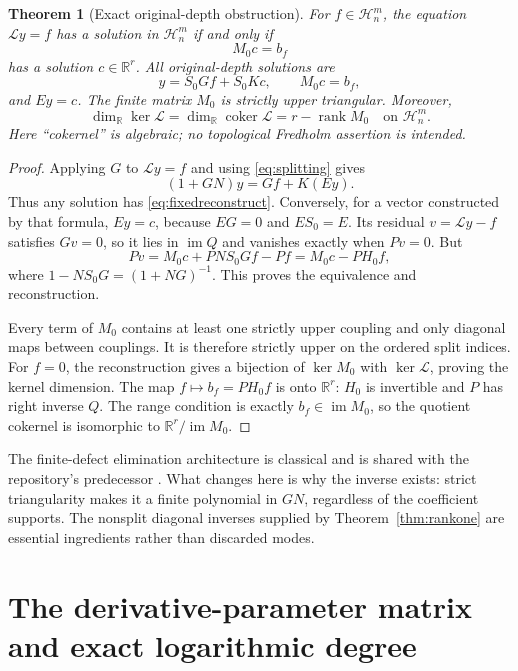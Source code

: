\documentclass[11pt,a4paper]{article}
\numberwithin{equation}{section}
\newtheorem{theorem}{Theorem}[section]
\theoremstyle{definition}
\theoremstyle{remark}\newtheorem{remark}[theorem]{Remark}
\newcommand{\R}{\mathbb R}\newcommand{\C}{\mathbb C}
\newcommand{\Hh}{\mathcal H}\newcommand{\Ll}{\mathcal L}
\newcommand{\rank}{\operatorname{rank}}\newcommand{\diag}{\operatorname{diag}}
\newcommand{\im}{\operatorname{im}}\newcommand{\coker}{\operatorname{coker}}
\begin{document}
\begin{theorem}[Exact original-depth obstruction]
\label{thm:fixed}
For $f\in\Hh_n^m$, the equation $\Ll y=f$ has a solution in $\Hh_n^m$ if and only if
\begin{equation}
 M_0c=b_f
 \label{eq:fixedmatrix}
\end{equation}
has a solution $c\in\R^r$. All original-depth solutions are
\begin{equation}
 y=S_0Gf+S_0Kc,\qquad M_0c=b_f,
 \label{eq:fixedreconstruct}
\end{equation}
and $Ey=c$. The finite matrix $M_0$ is strictly upper triangular. Moreover,
\begin{equation}
 \dim_\R\ker\Ll=\dim_\R\coker\Ll=r-\rank M_0
 \quad\text{on }\Hh_n^m.
 \label{eq:fredholm}
\end{equation}
Here ``cokernel'' is algebraic; no topological Fredholm assertion is intended.
\end{theorem}
\begin{proof}
Applying $G$ to $\Ll y=f$ and using \eqref{eq:splitting} gives
\[
 (1+GN)y=Gf+K(Ey).
\]
Thus any solution has \eqref{eq:fixedreconstruct}. Conversely, for a vector constructed by that formula, $Ey=c$, because $EG=0$ and $ES_0=E$. Its residual $v=\Ll y-f$ satisfies $Gv=0$, so it lies in $\im Q$ and vanishes exactly when $Pv=0$. But
\[
 Pv=M_0c+PNS_0Gf-Pf=M_0c-PH_0f,
\]
where $1-NS_0G=(1+NG)^{-1}$. This proves the equivalence and reconstruction.

Every term of $M_0$ contains at least one strictly upper coupling and only diagonal maps between couplings. It is therefore strictly upper on the ordered split indices. For $f=0$, the reconstruction gives a bijection of $\ker M_0$ with $\ker\Ll$, proving the kernel dimension. The map $f\mapsto b_f=PH_0f$ is onto $\R^r$: $H_0$ is invertible and $P$ has right inverse $Q$. The range condition is exactly $b_f\in\im M_0$, so the quotient cokernel is isomorphic to $\R^r/\im M_0$.
\end{proof}

The finite-defect elimination architecture is classical and is shared with the repository's predecessor \cite{repo-residue,repo-smith}. What changes here is why the inverse exists: strict triangularity makes it a finite polynomial in $GN$, regardless of the coefficient supports. The nonsplit diagonal inverses supplied by Theorem~\ref{thm:rankone} are essential ingredients rather than discarded modes.

\section{The derivative-parameter matrix and exact logarithmic degree}
\label{sec:matrix}
\end{document}

